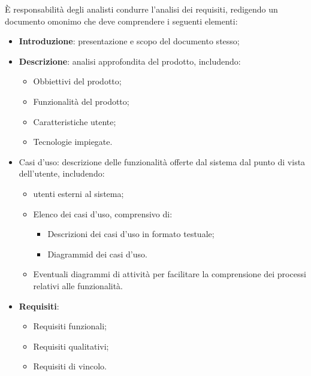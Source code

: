 È responsabilità degli analisti condurre l'analisi dei requisiti, redigendo un documento omonimo che deve comprendere i seguenti elementi:
\begin{itemize}
	\item \textbf{Introduzione}: presentazione e scopo del documento stesso;
	\item \textbf{Descrizione}:  analisi approfondita del prodotto, includendo:
	\begin{itemize}
		\item Obbiettivi del prodotto;
		\item Funzionalità del prodotto;
		\item Caratteristiche utente;
		\item Tecnologie impiegate.
	\end{itemize}
	\item Casi d'uso: descrizione delle funzionalità offerte dal sistema dal punto di vista dell'utente, includendo:
	\begin{itemize}
		\item utenti esterni al sistema;
		\item Elenco dei casi d'uso, comprensivo di:
		\begin{itemize}
			\item Descrizioni dei casi d'uso in formato testuale;
			\item Diagrammid dei casi d'uso.
		\end{itemize}
		\item Eventuali diagrammi di attività per facilitare la comprensione dei processi relativi alle funzionalità.
	\end{itemize}
	\item \textbf{Requisiti}:
	\begin{itemize}
		\item Requisiti funzionali;
		\item Requisiti qualitativi;
		\item Requisiti di vincolo.
	\end{itemize}
\end{itemize}

